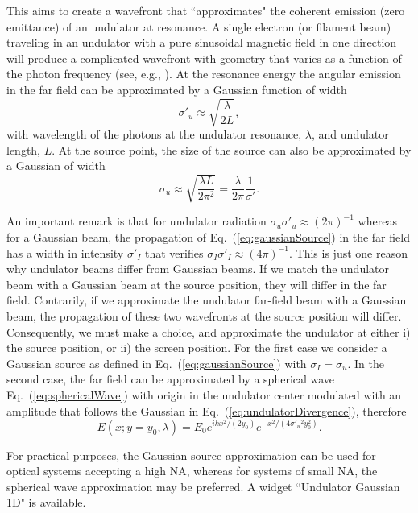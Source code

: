 \documentclass{iopconfser}
\begin{document}
This aims to create a wavefront that ``approximates" the coherent emission (zero emittance) of an undulator at resonance.
A single electron (or filament beam) traveling in an undulator with a pure sinusoidal magnetic field in one direction will produce a complicated wavefront with geometry that varies as a function of the photon frequency (see, e.g., \citep{elleaume}). At the resonance energy the angular emission in the far field can be approximated by a Gaussian function of width \citep{elleaume}
\begin{equation}
\label{eq:undulatorDivergence}
    \sigma'_u \approx\sqrt{\frac{\lambda}{2 L}},
\end{equation}
with wavelength of the photons at the undulator resonance, $\lambda$, and undulator length, $L$. At the source point, the size of the source can also be approximated by a Gaussian of width
\begin{equation}
\label{eq:undulatorSize}
    \sigma_u \approx\sqrt{\frac{\lambda L}{2 \pi^2}} = \frac{\lambda}{2 \pi} \frac{1}{\sigma'}.
\end{equation}

An important remark is that for undulator radiation $\sigma_u \sigma'_{u} \approx (2\pi)^{-1}$ whereas for a Gaussian beam, the propagation of Eq.~(\ref{eq:gaussianSource}) in the far field has a width in intensity $\sigma'_{I}$ that verifies $\sigma_I \sigma'_{I} \approx (4\pi)^{-1}$. This is just one reason why undulator beams differ from Gaussian beams. If we match the undulator beam with a Gaussian beam at the source position, they will differ in the far field. Contrarily, if we approximate the undulator far-field beam with a Gaussian beam, the propagation of these two wavefronts at the source position will differ. 
Consequently, we must make a choice, and approximate the undulator at either i) the source position, or ii) the screen position. 
For the first case we consider a  Gaussian source as defined in Eq.~(\ref{eq:gaussianSource}) with $\sigma_I=\sigma_u$.
In the second case, the far field can be approximated by a spherical wave Eq.~(\ref{eq:sphericalWave}) with origin in the undulator center modulated with an amplitude that follows the Gaussian in Eq.~(\ref{eq:undulatorDivergence}), therefore
\begin{equation}  \label{eq:undulatorBySphericalWave}
    E(x;y=y_0,\lambda) = E_0 e^{i k x^2 / (2 y_0)} e^{-x^2/(4 \sigma'_u{}^2 y_0^2)}.
\end{equation}

For practical purposes, the Gaussian source approximation can be used for optical systems accepting a high NA, whereas for systems of small NA, the spherical wave approximation may be preferred. A widget ``Undulator Gaussian 1D" is available.
\end{document}
